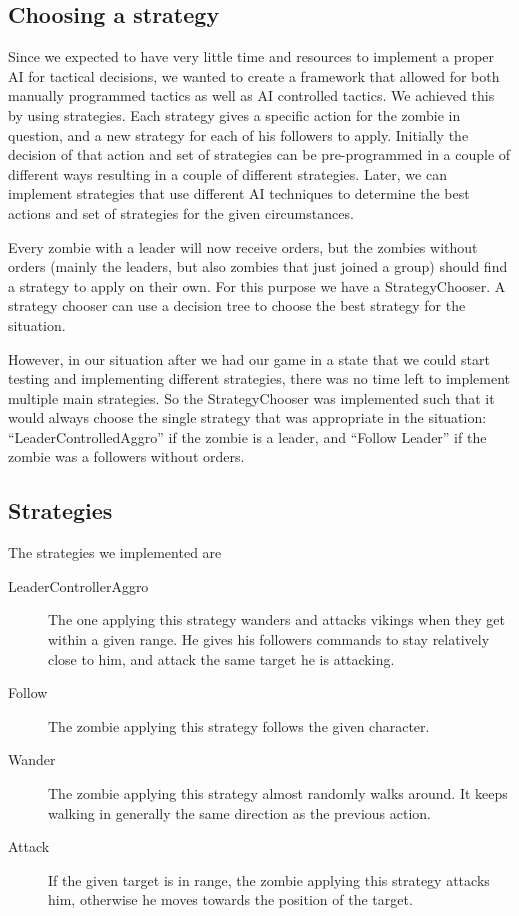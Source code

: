 \subsection{Choosing a strategy}
Since we expected to have very little time and resources to implement a proper AI for tactical decisions, we wanted to create a framework that allowed for both manually programmed tactics as well as AI controlled tactics. We achieved this by using strategies. Each strategy gives a specific action for the zombie in question, and a new strategy for each of his followers to apply. Initially the decision of that action and set of strategies can be pre-programmed in a couple of different ways resulting in a couple of different strategies. Later, we can implement strategies that use different AI techniques to determine the best actions and set of strategies for the given circumstances.

Every zombie with a leader will now receive orders, but the zombies without orders (mainly the leaders, but also zombies that just joined a group) should find a strategy to apply on their own. For this purpose we have a StrategyChooser. A strategy chooser can use a decision tree to choose the best strategy for the situation.

However, in our situation after we had our game in a state that we could start testing and implementing different strategies, there was no time left to implement multiple main strategies. So the StrategyChooser was implemented such that it would always choose the single strategy that was appropriate in the situation: ``LeaderControlledAggro'' if the zombie is a leader, and ``Follow Leader'' if the zombie was a followers without orders.

\subsection{Strategies}
The strategies we implemented are
\begin{description}
 \item [LeaderControllerAggro] The one applying this strategy wanders and attacks vikings when they get within a given range. He gives his followers commands to stay relatively close to him, and attack the same target he is attacking.
 \item [Follow] The zombie applying this strategy follows the given character.
 \item [Wander] The zombie applying this strategy almost randomly walks around. It keeps walking in generally the same direction as the previous action.
 \item [Attack] If the given target is in range, the zombie applying this strategy attacks him, otherwise he moves towards the position of the target.
\end{description}

